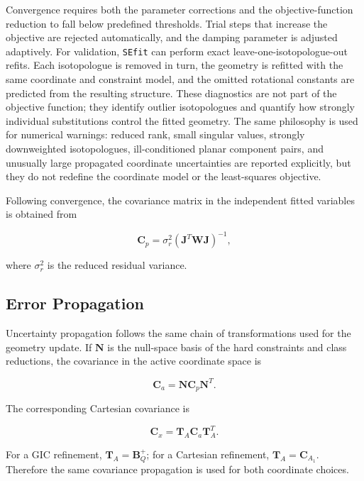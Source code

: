\documentclass[journal=jctcce,manuscript=article,maxauthors=999]{achemso}
\begin{document}
Convergence requires both the parameter corrections and the objective-function
reduction to fall below predefined thresholds. Trial steps that increase the
objective are rejected automatically, and the damping parameter is adjusted
adaptively.
For validation, \texttt{SEfit} can perform exact leave-one-isotopologue-out
refits. Each isotopologue is removed in turn, the geometry is refitted with the
same coordinate and constraint model, and the omitted rotational constants are
predicted from the resulting structure. These diagnostics are not part of the
objective function; they identify outlier isotopologues and quantify how
strongly individual substitutions control the fitted geometry.
The same philosophy is used for numerical warnings: reduced rank, small
singular values, strongly downweighted isotopologues, ill-conditioned planar
component pairs, and unusually large propagated coordinate uncertainties are
reported explicitly, but they do not redefine the coordinate model or the
least-squares objective.

Following convergence, the covariance matrix in the independent fitted
variables is obtained from

\begin{equation}
\mathbf{C}_{p}
=
\sigma_r^2
\left(
\mathbf{J}^{T}
\mathbf{W}
\mathbf{J}
\right)^{-1},
\end{equation}

where $\sigma_r^2$ is the reduced residual variance.

\subsection{Error Propagation}

Uncertainty propagation follows the same chain of transformations used for the
geometry update. If $\mathbf{N}$ is the null-space basis of the hard
constraints and class reductions, the covariance in the active coordinate
space is

\begin{equation}
\mathbf{C}_{a}
=
\mathbf{N}
\mathbf{C}_{p}
\mathbf{N}^{T}.
\end{equation}

The corresponding Cartesian covariance is

\begin{equation}
\mathbf{C}_{x}
=
\mathbf{T}_{A}
\mathbf{C}_{a}
\mathbf{T}_{A}^{T}.
\end{equation}

For a GIC refinement, $\mathbf{T}_{A}=\mathbf{B}_{Q}^{+}$; for a Cartesian
refinement, $\mathbf{T}_{A}=\mathbf{C}_{A_1}$. Therefore the same covariance
propagation is used for both coordinate choices.
\end{document}
